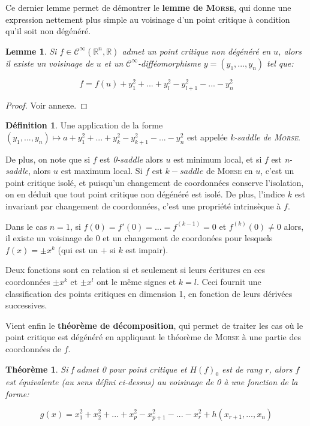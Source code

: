 \documentclass{article}
\newcommand{\cinf}{\mathcal{C}^\infty}
\newcommand{\R}{\mathbb{R}}
\newtheorem{thm}{Théorème}
\newtheorem{lemm}{Lemme}
\theoremstyle{definition}
\newtheorem{defn}{Définition}
\begin{document}
Ce dernier lemme permet de démontrer le \textbf{lemme de \textsc{Morse}}, qui donne une expression nettement plus simple au voisinage d'un point critique à condition qu'il soit non dégénéré.

\begin{lemm}
	Si $f\in\cinf(\R^n,\R)$ admet un point critique non dégénéré en $u$, alors il existe un voisinage de $u$ et un $\cinf$-difféomorphisme $y=(y_1,...,y_n)$ tel que:

	$$f=f(u)+y_1^2+...+y_l^2-y_{l+1}^2-...-y_n^2$$
\end{lemm}

\begin{proof} Voir annexe. \end{proof}

\begin{defn}
	Une application de la forme $(y_1,...,y_n)\mapsto a+y_1^2+...+y_k^2-y_{k+1}^2-...-y_n^2$ est appelée \textit{k-saddle de \textsc{Morse}}.
\end{defn}

De plus, on note que si $f$ est \textit{0-saddle} alors $u$ est minimum local, et si $f$ est \textit{n-saddle}, alors $u$ est maximum local.
Si $f$ est $k-saddle$ de \textsc{Morse} en $u$, c'est un point critique isolé, et puisqu'un changement de coordonnées conserve l'isolation, on en déduit que tout point critique non dégénéré est isolé.
De plus, l'indice $k$ est invariant par changement de coordonnées, c'est une propriété intrinsèque à $f$.

Dans le cas $n=1$, si $f(0)=f'(0)=...=f^{(k-1)}=0$ et $f^{(k)}(0)\neq 0$ alors, il existe un voisinage de 0 et un changement de coordonées pour lesquels $f(x)=\pm x^k$ (qui est un $+$ si $k$ est impair).

Deux fonctions sont en relation si et seulement si leurs écritures en ces coordonnées $\pm x^k$ et $\pm x^l$ ont le même signes et $k=l$. Ceci fournit une classification des points critiques en dimension 1, en fonction de leurs dérivées successives.

Vient enfin le \textbf{théorème de décomposition}, qui permet de traiter les cas où le point critique est dégénéré en appliquant le théorème de \textsc{Morse} à une partie des coordonnées de $f$.

\begin{thm}
	Si f admet 0 pour point critique et $H(f)_0$ est de rang $r$, alors $f$ est équivalente (au sens défini ci-dessus) au voisinage de 0 à une fonction de la forme:

	$$g(x)= x_1^2+x_2^2+ ...+x_p^2-x_{p+1}^2 -...- x_r^2 + h(x_{r+1},...,x_n)$$
\end{thm}
\end{document}
